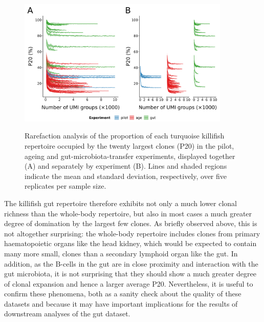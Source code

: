 \begin{figure}
\centering
\includegraphics[width = 0.9\textwidth]{_Figures/png/igseq-rarefied-clone-p20}
\begin{subfigure}{0em}
\label{fig:igseq-rarefied-clone-p20-all}
\end{subfigure}
\begin{subfigure}{0em}
\label{fig:igseq-rarefied-clone-p20-facets}
\end{subfigure}
\caption{Rarefaction analysis of the proportion of each turquoise killifish repertoire occupied by the twenty largest clones (P20) in the \igseq pilot, ageing and gut-microbiota-transfer experiments, displayed together (A) and separately by experiment (B). Lines and shaded regions indicate the mean and standard deviation, respectively, over five replicates per sample size.}
\label{fig:igseq-rarefied-clone-p20}
\end{figure}

The killifish gut repertoire therefore exhibits not only a much lower clonal richness than the whole-body repertoire, but also in most cases a much greater degree of domination by the largest few clones. As briefly observed above, this is not altogether surprising: the whole-body repertoire includes clones from primary haematopoietic organs like the head kidney, which would be expected to contain many more small, \naive clones than a secondary lymphoid organ like the gut. In addition, as the B-cells in the gut are in close proximity and interaction with the gut microbiota, it is not surprising that they should show a much greater degree of clonal expansion and hence a larger average P20. Nevertheless, it is useful to confirm these phenomena, both as a sanity check about the quality of these datasets and because it may have important implications for the results of downstream analyses of the gut dataset.

